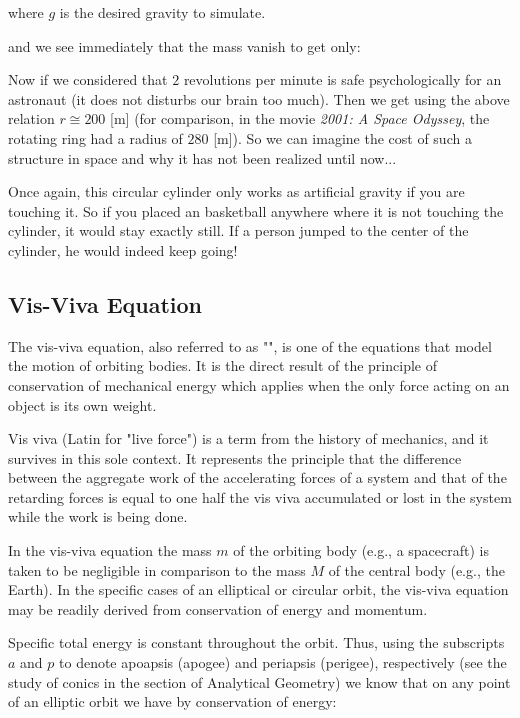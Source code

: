 	where $g$ is the desired gravity to simulate.
	
	and we see immediately that the mass vanish to get only:
	
	Now if we considered that $2$ revolutions per minute is safe psychologically for an astronaut (it does not disturbs our brain too much). Then we get using the above relation $r\cong 200$ [m] (for comparison, in the movie \textit{2001: A Space Odyssey}, the rotating ring had a radius of $280$ [m]). So we can imagine the cost of such a structure in space and why it has not been realized until now...
	
	Once again, this circular cylinder only works as artificial gravity if you are touching it. So if you placed an basketball anywhere where it is not touching the cylinder, it would stay exactly still. If a person jumped to the center of the cylinder, he would indeed keep going!

	\subsection{Vis-Viva Equation}
	 The vis-viva equation, also referred to as "", is one of the equations that model the motion of orbiting bodies. It is the direct result of the principle of conservation of mechanical energy which applies when the only force acting on an object is its own weight.
	 \begin{tcolorbox}[title=Remark,colframe=black,arc=10pt]
	Vis viva (Latin for "live force") is a term from the history of mechanics, and it survives in this sole context. It represents the principle that the difference between the aggregate work of the accelerating forces of a system and that of the retarding forces is equal to one half the vis viva accumulated or lost in the system while the work is being done.
	\end{tcolorbox}
	In the vis-viva equation the mass $m$ of the orbiting body (e.g., a spacecraft) is taken to be negligible in comparison to the mass $M$ of the central body (e.g., the Earth). In the specific cases of an elliptical or circular orbit, the vis-viva equation may be readily derived from conservation of energy and momentum.

	Specific total energy is constant throughout the orbit. Thus, using the subscripts $a$ and $p$ to denote apoapsis (apogee) and periapsis (perigee), respectively (see the study of conics in the section of Analytical Geometry) we know that on any point of an elliptic orbit we have by conservation of energy:
	
